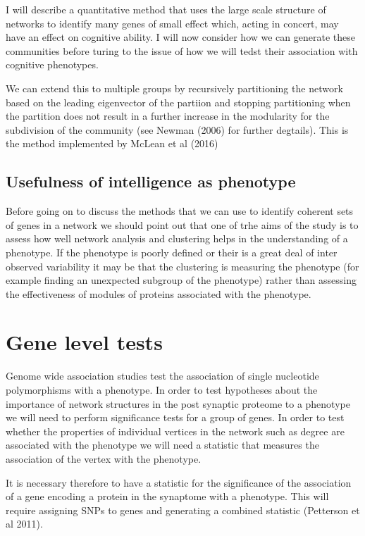I will describe a quantitative method that uses the large scale structure of networks to identify many genes of small effect which, acting in concert, may have an effect on cognitive ability. I will now consider how we can generate these communities before turing to the issue of how we will tedst their association with cognitive phenotypes.


We can extend this to multiple groups by recursively partitioning the network based on the leading eigenvector of the partiion and stopping partitioning when the partition does not result in a further increase in the modularity for the subdivision of the community (see Newman (2006) for further degtails). This is the method implemented by McLean et al (2016)

\subsection{Usefulness of intelligence as phenotype}
\label{sec:Intelligence intro usefulness of intelligence as phenotype}
Before going on to discuss the methods that we can use to identify coherent sets of genes in a network we should point out that one of trhe aims of the study is to assess how well network analysis and clustering helps in the understanding of a phenotype. If the phenotype is poorly defined or their is a great deal of inter observed variability it may be that the clustering is measuring the phenotype (for example finding an unexpected subgroup of the phenotype) rather than assessing the effectiveness of modules of proteins associated with the phenotype.

\section{Gene level tests}
Genome wide association studies test the association of single nucleotide polymorphisms with a phenotype.
In order to test hypotheses about the importance of network structures in the post synaptic proteome to a phenotype we will need to perform significance tests for a group of genes. In order to test whether the properties of individual vertices in the network such as degree are associated with the phenotype we will need a statistic that measures the association of the vertex with the phenotype.  

It is necessary therefore to have a statistic for the significance of the association of a gene encoding a protein in the synaptome with a phenotype. This will require assigning SNPs to genes and generating a combined statistic (Petterson et al 2011).

